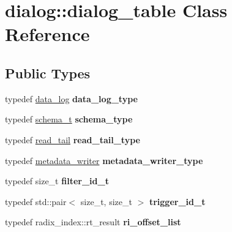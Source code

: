 \hypertarget{classdialog_1_1dialog__table}{}\section{dialog\+:\+:dialog\+\_\+table Class Reference}
\label{classdialog_1_1dialog__table}
\subsection*{Public Types}
\begin{DoxyCompactItemize}
\item 
\mbox{\label{classdialog_1_1dialog__table_a7ba15c8e7a8715b84ab6869fc25f5c35}} 
typedef \hyperlink{classdialog_1_1monolog_1_1monolog__linear}{data\+\_\+log} {\bfseries data\+\_\+log\+\_\+type}
\item 
\mbox{\label{classdialog_1_1dialog__table_a34908f19a70144fd5096ec036b56fa78}} 
typedef \hyperlink{classdialog_1_1schema__t}{schema\+\_\+t} {\bfseries schema\+\_\+type}
\item 
\mbox{\label{classdialog_1_1dialog__table_aaff5fc77c78bc04aaf959b35ba9eed5d}} 
typedef \hyperlink{classdialog_1_1read__tail}{read\+\_\+tail} {\bfseries read\+\_\+tail\+\_\+type}
\item 
\mbox{\label{classdialog_1_1dialog__table_a9c4ee1cfb87e92acab8f9bff83092f88}} 
typedef \hyperlink{classdialog_1_1metadata__writer}{metadata\+\_\+writer} {\bfseries metadata\+\_\+writer\+\_\+type}
\item 
\mbox{\label{classdialog_1_1dialog__table_ac3b524a812a24f879cd1c38fc17680d2}} 
typedef size\+\_\+t {\bfseries filter\+\_\+id\+\_\+t}
\item 
\mbox{\label{classdialog_1_1dialog__table_ac2a8049101ac1b95d08814bb272abdc6}} 
typedef std\+::pair$<$ size\+\_\+t, size\+\_\+t $>$ {\bfseries trigger\+\_\+id\+\_\+t}
\item 
\mbox{\label{classdialog_1_1dialog__table_a78c79b370ad051ab8e0145b4874d1594}} 
typedef radix\+\_\+index\+::rt\+\_\+result {\bfseries ri\+\_\+offset\+\_\+list}

\end{DoxyCompactItemize}
